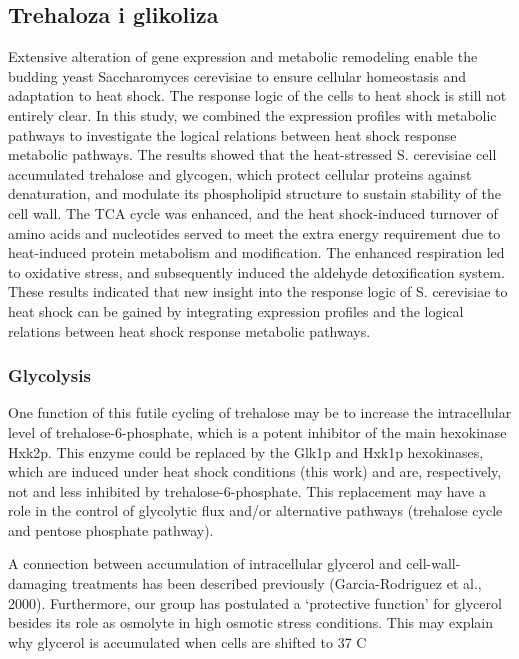 \documentclass{pracamgr}
\begin{document}
\subsection{Trehaloza i glikoliza}

Extensive alteration of gene expression and metabolic remodeling enable the budding yeast Saccharomyces cerevisiae to
ensure cellular homeostasis and adaptation to heat shock. The response logic of the cells to heat shock is still not entirely clear. 
In this study, we combined the expression profiles with metabolic pathways to investigate the logical relations between heat shock response metabolic pathways. 
The results showed that the heat-stressed S. cerevisiae cell accumulated trehalose and glycogen, which protect cellular proteins against denaturation, and modulate 
its phospholipid structure to sustain stability of the cell wall. The TCA cycle was enhanced, and the heat shock-induced turnover of amino acids
and nucleotides served to meet the extra energy requirement due to heat-induced protein metabolism and modification. The enhanced respiration led
to oxidative stress, and subsequently induced the aldehyde detoxification system. These results indicated that new insight into the response logic
of S. cerevisiae to heat shock can be gained by integrating expression profiles and the logical relations between heat shock response metabolic pathways.\cite{ResponseLogic}
\subsubsection{Glycolysis}

One function of this futile cycling
of trehalose may be to increase the intracellular level of
trehalose-6-phosphate, which is a potent inhibitor of the
main hexokinase Hxk2p. This enzyme could be replaced by the Glk1p
and Hxk1p hexokinases, which are induced under heat
shock conditions (this work) and are, respectively, not and
less inhibited by trehalose-6-phosphate. This replacement may have a role in the control of
glycolytic flux and/or alternative pathways (trehalose cycle
and pentose phosphate pathway).\cite{MsnContraHsf1}

A connection between accumulation of intracellular
glycerol and cell-wall-damaging treatments has been
described previously (Garcia-Rodriguez et al., 2000).
Furthermore, our group has postulated a ‘protective
function’ for glycerol besides its role as osmolyte in high
osmotic stress conditions. This may explain why glycerol
is accumulated when cells are shifted to 37 C \cite{GlycerolAccumulate}
\end{document}

